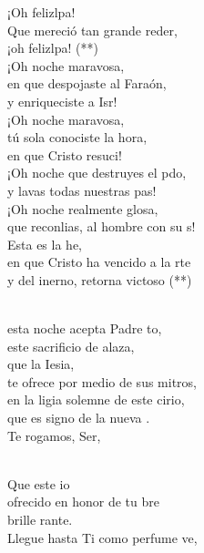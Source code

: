 \begin{cancion}
	\begin{chorus}%
	¡Oh felizlpa!\\
	Que mereció tan grande reder,\\
	¡oh felizlpa! (**)\\
	¡Oh noche maravosa,\\
en que despojaste al Faraón,\\
	y enriqueciste a Isr!\\
	¡Oh noche maravosa,\\
tú sola conociste la hora,\\
	en que Cristo resuci!\\
	¡Oh noche que destruyes el pdo,\\
	y lavas todas nuestras pas!\\
	¡Oh noche realmente glosa,\\
	que reconlias, al hombre con su s!\\
	Esta es la he,\\
	en que Cristo ha vencido a la rte\\
	y del inerno, retorna victoso (**)\\
	\end{chorus}%
	\jump\\
	esta noche acepta Padre to,\\
	este sacrificio de alaza,\\
	que la Iesia,\\
	te ofrece por medio de sus mitros,\\
	en la ligia solemne de este cirio,\\
	que es signo de la nueva .\\
	Te rogamos, Ser,\\\jump\\
	\begin{chorus}%
	Que este io\\
	ofrecido en honor de tu bre\\
	brille rante.\\
	Llegue hasta Ti como perfume ve,\\

\end{chorus}
\end{cancion}
